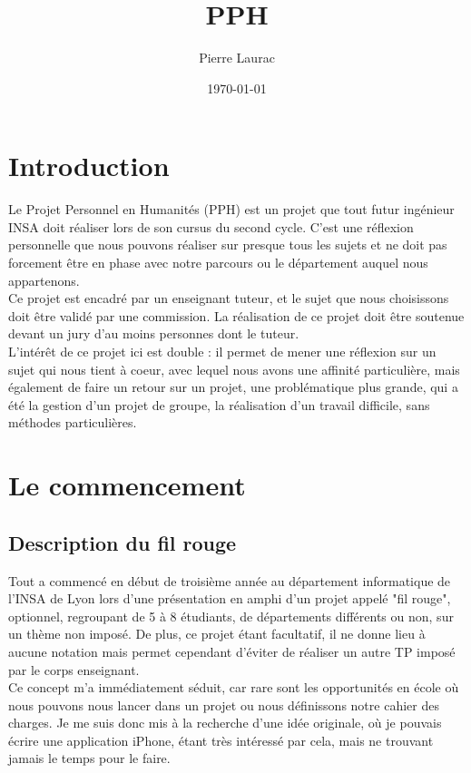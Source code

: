 \documentclass{article}
\title{PPH}
\author{Pierre Laurac}
\date\today
\begin{document}
\maketitle

\newpage
\tableofcontents


\newpage
\section{Introduction}
Le Projet Personnel en Humanités (PPH) est un projet que tout futur ingénieur INSA doit réaliser lors de son cursus du second cycle. C'est une réflexion personnelle que nous pouvons réaliser sur presque tous les sujets et ne doit pas forcement être en phase avec notre parcours ou le département auquel nous appartenons.\\

Ce projet est encadré par un enseignant tuteur, et le sujet que nous choisissons doit être validé par une commission. La réalisation de ce projet doit être soutenue devant un jury d'au moins personnes dont le tuteur. \\

L'intérêt de ce projet ici est double : il permet de mener une réflexion sur un sujet qui nous tient à coeur, avec lequel nous avons une affinité particulière, mais également de faire un retour sur un projet, une problématique plus grande, qui a été la gestion d'un projet de groupe, la réalisation d'un travail difficile, sans méthodes particulières.\\
\section{Le commencement}
\subsection{Description du fil rouge}
	Tout a commencé en début de troisième année au département informatique de l'INSA de Lyon lors d'une présentation en amphi d'un projet appelé "fil rouge", optionnel, regroupant de 5 à 8 étudiants, de départements différents ou non, sur un thème non imposé. De plus, ce projet étant facultatif, il ne donne lieu à aucune notation mais permet cependant d'éviter de réaliser un autre TP imposé par le corps enseignant.\\
	
	Ce concept m’a immédiatement séduit, car rare sont les opportunités en école où nous pouvons nous lancer dans un projet ou nous définissons notre cahier des charges. Je me suis donc mis à la recherche d’une idée originale, où je pouvais écrire une application iPhone, étant très intéressé par cela, mais ne trouvant jamais le temps pour le faire.\\
	
\end{document}
